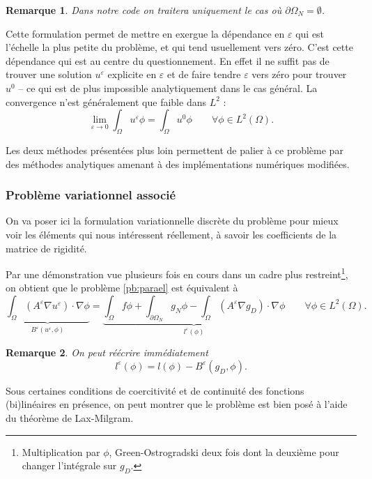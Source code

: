 \documentclass[11pt]{article}
\newtheorem{rmq}{Remarque}
\newcommand{\Ae}{A^\varepsilon}
\newcommand{\Be}{B^\varepsilon}
\newcommand{\ue}{u^\varepsilon}
\begin{document}
\begin{rmq}
  Dans notre code on traitera uniquement le cas où $\partial \Omega_N = \emptyset$.
\end{rmq}
Cette formulation permet de mettre en exergue la dépendance en $\varepsilon$ qui est l'échelle la plus petite du problème, et qui tend usuellement
vers zéro. C'est cette dépendance qui est au centre du questionnement. En effet il ne suffit pas de trouver une solution $\ue$ explicite en
$\varepsilon$ et de faire tendre $\varepsilon$ vers zéro pour trouver $u^0$ -- ce qui est de plus impossible analytiquement dans le cas général. La
convergence n'est généralement que faible dans $L^2$ :
\[
  \lim_{\varepsilon \to 0} \int_\Omega \ue \phi = \int_\Omega u^0 \phi \qquad \forall \phi \in L^2(\Omega).
\]

Les deux méthodes présentées plus loin permettent de palier à ce problème par des méthodes analytiques amenant à des implémentations numériques modifiées.


\subsubsection{Problème variationnel associé}
\label{sec:pbvar}

On va poser ici la formulation variationnelle discrète du problème pour mieux voir les éléments qui nous intéressent réellement, à savoir les coefficients
de la matrice de rigidité.

Par une démonstration vue plusieurs fois en cours dans un cadre plus restreint\footnote{Multiplication par $\phi$,
  Green-Ostrogradski deux fois dont la deuxième pour changer l'intégrale sur $g_D$.}, on obtient que le problème \ref{pb:parael} est équivalent à
\begin{equation}
  \underbrace{\int_\Omega (\Ae \nabla \ue)\cdot \nabla \phi}_{\Be(\ue, \phi)} =
  \underbrace{\int_\Omega f \phi + \int_{\partial \Omega_N} g_N \phi - \int_{\Omega} (\Ae \nabla g_D)\cdot \nabla \phi}_{l^{\varepsilon}(\phi)}
  \qquad \forall \phi \in L^2(\Omega).
\end{equation}

\begin{rmq}
  On peut réécrire immédiatement
  \[
    l^{\varepsilon}(\phi) = l(\phi) - \Be(g_D, \phi).
  \]
\end{rmq}

Sous certaines conditions de coercitivité et de continuité des fonctions (bi)linéaires en présence, on peut montrer que le problème est bien posé à l'aide
du théorème de Lax-Milgram.
\end{document}

